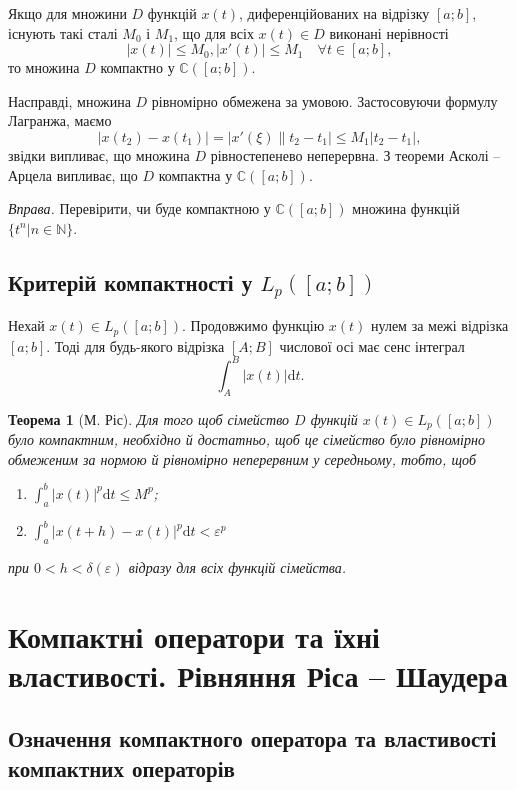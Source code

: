 \documentclass[14pt,twoside]{extreport}
\theoremstyle{mystyle}
\newtheorem{thm}{Теорема}
\numberwithin{equation}{chapter}
\newcommand{\cab}{\mathbb{C}([a; b])}
\begin{document}
Якщо для множини $D$ функцій $x(t)$, диференційованих на відрізку $[a; b]$, існують такі сталі $M_0$ і $M_1$, що для всіх $x(t) \in D$ виконані нерівності \[|x(t)| \leqslant M_0, |x'(t)|\leqslant M_1\quad \forall t \in [a; b],\]то множина $D$ компактно у $\cab$.

Насправді, множина $D$ рівномірно обмежена за умовою. Застосовуючи формулу Лагранжа, маємо
\[|x(t_2) - x(t_1)|=|x'(\xi)\|t_2 - t_1|\leqslant M_1 |t_2 - t_1|,\]
звідки випливає, що множина $D$ рівностепенево неперервна. З теореми Асколі -- Арцела випливає, що $D$ компактна у $\cab$.

\begin{small}
\emph{Вправа.} Перевірити, чи буде компактною у $\cab$ множина функцій $\{t^n|n\in\mathbb{N}\}$.
\end{small}

\section{Критерій компактності у \texorpdfstring{$L_p([a; b])$}{Lp([a;b])}}

Нехай $x(t) \in L_p([a; b])$. Продовжимо функцію $x(t)$ нулем за межі відрізка $[a; b]$. Тоді для будь-якого відрізка $[A; B]$ числової осі має сенс інтеграл
\[
\int_{A}^{B} |x(t)| \mathrm{d}t.
\]

\begin{thm}[М. Ріс]
	Для того щоб сімейство $D$ функцій $x(t) \in L_p([a;b])$ було компактним, необхідно й достатньо, щоб це сімейство було рівномірно обмеженим за нормою й рівномірно неперервним у середньому, тобто, щоб
	\begin{enumerate}
		\item $\int_{a}^{b} |x(t)|^p \mathrm{d}t \leqslant M^p$;
		\item $\int_{a}^{b} |x(t+h) - x(t)|^p \mathrm{d}t < \varepsilon^p$
	\end{enumerate}
	при $0 < h < \delta(\varepsilon)$ відразу для всіх функцій сімейства.
\end{thm}

\chapter{Компактні оператори та їхні властивості. Рівняння Ріса -- Шаудера}

\section{Означення компактного оператора та властивості компактних операторів}
\end{document}
